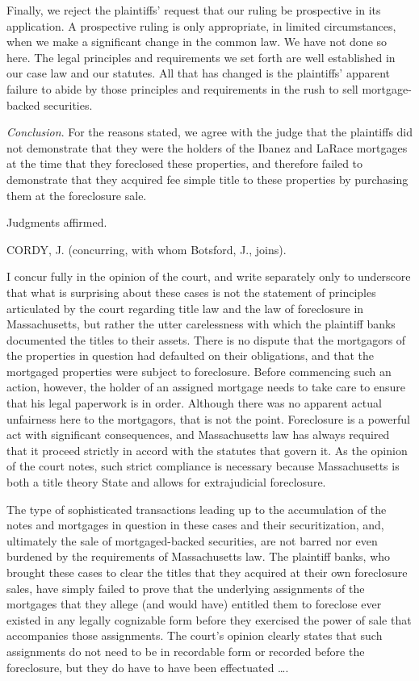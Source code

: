 Finally, we reject the plaintiffs' request that our ruling be prospective in its
application. A prospective ruling is only appropriate, in limited
circumstances, when we make a significant change in the common law. We have not
done so here. The legal principles and requirements we set forth are well
established in our case law and our statutes. All that has changed is the
plaintiffs' apparent failure to abide by those principles and requirements in
the rush to sell mortgage-backed securities.

\textit{Conclusion}. For the reasons stated, we agree with the judge that the
plaintiffs did not demonstrate that they were the holders of the Ibanez and
LaRace mortgages at the time that they foreclosed these properties, and
therefore failed to demonstrate that they acquired fee simple title to these
properties by purchasing them at the foreclosure sale.

Judgments affirmed.

CORDY, J. (concurring, with whom Botsford, J., joins).

I concur fully in the opinion of the court, and write separately only to
underscore that what is surprising about these cases is not the statement of
principles articulated by the court regarding title law and the law of
foreclosure in Massachusetts, but rather the utter carelessness with which the
plaintiff banks documented the titles to their assets. There is no dispute that
the mortgagors of the properties in question had defaulted on their
obligations, and that the mortgaged properties were subject to foreclosure.
Before commencing such an action, however, the holder of an assigned mortgage
needs to take care to ensure that his legal paperwork is in order. Although
there was no apparent actual unfairness here to the mortgagors, that is not the
point. Foreclosure is a powerful act with significant consequences, and
Massachusetts law has always required that it proceed strictly in accord with
the statutes that govern it. As the opinion of the court notes, such strict
compliance is necessary because Massachusetts is both a title theory State and
allows for extrajudicial foreclosure.

The type of sophisticated transactions leading up to the accumulation of the
notes and mortgages in question in these cases and their securitization, and,
ultimately the sale of mortgaged-backed securities, are not barred nor even
burdened by the requirements of Massachusetts law. The plaintiff banks, who
brought these cases to clear the titles that they acquired at their own
foreclosure sales, have simply failed to prove that the underlying assignments
of the mortgages that they allege (and would have) entitled them to foreclose
ever existed in any legally cognizable form before they exercised the power of
sale that accompanies those assignments. The court's opinion clearly states
that such assignments do not need to be in recordable form or recorded before
the foreclosure, but they do have to have been effectuated \dots.

